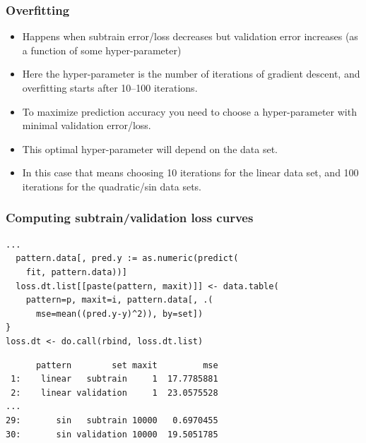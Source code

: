 \documentclass{beamer}
\begin{document}


\begin{frame}
  \frametitle{Overfitting}
  \begin{itemize}
  \item Happens when subtrain error/loss decreases but validation error
    increases (as a function of some hyper-parameter)
  \item Here the hyper-parameter is the number of iterations of
    gradient descent, and overfitting starts after 10--100 iterations.
  \item To maximize prediction accuracy you need to choose a
    hyper-parameter with minimal validation error/loss.
  \item This optimal hyper-parameter will depend on the data set.
  \item In this case that means choosing 10 iterations for the linear
    data set, and 100 iterations for the quadratic/sin data sets.
  \end{itemize}
\end{frame}

\begin{frame}[fragile]
  \frametitle{Computing subtrain/validation loss curves}

\begin{verbatim}
...
  pattern.data[, pred.y := as.numeric(predict(
    fit, pattern.data))]
  loss.dt.list[[paste(pattern, maxit)]] <- data.table(
    pattern=p, maxit=i, pattern.data[, .(
      mse=mean((pred.y-y)^2)), by=set])
}
loss.dt <- do.call(rbind, loss.dt.list)
\end{verbatim}
  
\begin{verbatim}
      pattern        set maxit         mse
 1:    linear   subtrain     1  17.7785881
 2:    linear validation     1  23.0575528
...
29:       sin   subtrain 10000   0.6970455
30:       sin validation 10000  19.5051785
\end{verbatim}
\end{frame}


\end{document}
